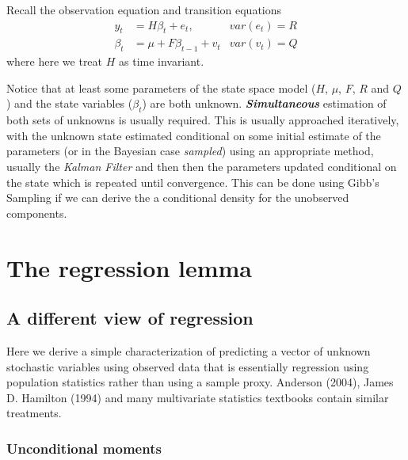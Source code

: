 \documentclass[
  letterpaper,
]{book}
\begin{document}
Recall the observation equation and transition equations \[
    \begin{align}
    y_t       &= H\beta_t + e_t,         &var(e_t)=R \\
    \beta_t   &= \mu + F\beta_{t-1}+v_t  &var(v_t)=Q
    \end{align}
\] where here we treat \(H\) as time invariant.

Notice that at least some parameters of the state space model (\(H\),
\(\mu\), \(F\), \(R\) and \(Q\)) and the state variables (\(\beta_t\))
are both unknown. \textbf{\emph{Simultaneous}} estimation of both sets
of unknowns is usually required. This is usually approached iteratively,
with the unknown state estimated conditional on some initial estimate of
the parameters (or in the Bayesian case \emph{sampled}) using an
appropriate method, usually the \emph{Kalman Filter} and then then the
parameters updated conditional on the state which is repeated until
convergence. This can be done using Gibb's Sampling if we can derive the
a conditional density for the unobserved components.

\hypertarget{the-regression-lemma}{%
\chapter{The regression lemma}\label{the-regression-lemma}}

\hypertarget{a-different-view-of-regression}{%
\section{A different view of
regression}\label{a-different-view-of-regression}}

Here we derive a simple characterization of predicting a vector of
unknown stochastic variables using observed data that is essentially
regression using population statistics rather than using a sample proxy.
Anderson (2004), James D. Hamilton (1994) and many multivariate
statistics textbooks contain similar treatments.

\hypertarget{unconditional-moments}{%
\subsection{Unconditional moments}\label{unconditional-moments}}
\end{document}
